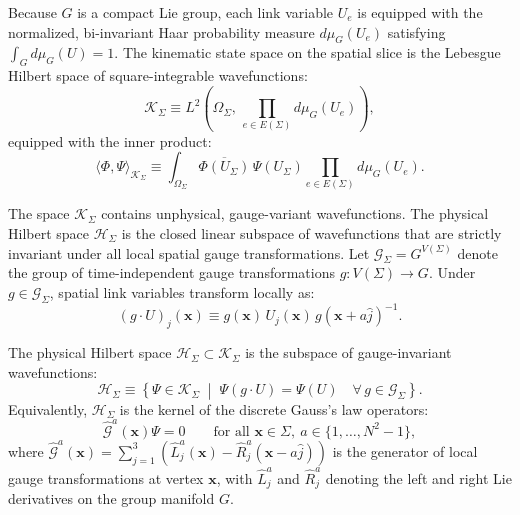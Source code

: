 Because $G$ is a compact Lie group, each link variable $U_e$ is equipped with the normalized, bi-invariant Haar probability measure $d\mu_G(U_e)$ satisfying $\int_G d\mu_G(U) = 1$. The kinematic state space on the spatial slice is the Lebesgue Hilbert space of square-integrable wavefunctions:
\begin{equation}
\label{eq:kinematic_hilbert_space}
\mathcal{K}_\Sigma \equiv L^2\left( \Omega_\Sigma, \, \prod_{e \in E(\Sigma)} d\mu_G(U_e) \right),
\end{equation}
equipped with the inner product:
\begin{equation}
\label{eq:kinematic_inner_product}
\langle \Phi, \Psi \rangle_{\mathcal{K}_\Sigma} \equiv \int_{\Omega_\Sigma} \overline{\Phi(U_\Sigma)} \, \Psi(U_\Sigma) \prod_{e \in E(\Sigma)} d\mu_G(U_e).
\end{equation}

The space $\mathcal{K}_\Sigma$ contains unphysical, gauge-variant wavefunctions. The physical Hilbert space $\mathcal{H}_\Sigma$ is the closed linear subspace of wavefunctions that are strictly invariant under all local spatial gauge transformations. Let $\mathcal{G}_\Sigma = G^{V(\Sigma)}$ denote the group of time-independent gauge transformations $g: V(\Sigma) \to G$. Under $g \in \mathcal{G}_\Sigma$, spatial link variables transform locally as:
\begin{equation}
\label{eq:spatial_gauge_transformation}
(g \cdot U)_j(\mathbf{x}) \equiv g(\mathbf{x}) \, U_j(\mathbf{x}) \, g(\mathbf{x} + a\hat{j})^{-1}.
\end{equation}

\begin{definition}
\label{def:physical_hilbert_space}
The physical Hilbert space $\mathcal{H}_\Sigma \subset \mathcal{K}_\Sigma$ is the subspace of gauge-invariant wavefunctions:
\begin{equation}
\label{eq:physical_hilbert_def}
\mathcal{H}_\Sigma \equiv \left\{ \Psi \in \mathcal{K}_\Sigma \;\middle|\; \Psi(g \cdot U) = \Psi(U) \quad \forall \, g \in \mathcal{G}_\Sigma \right\}.
\end{equation}
Equivalently, $\mathcal{H}_\Sigma$ is the kernel of the discrete Gauss's law operators:
\begin{equation}
\label{eq:discrete_gauss_law}
\hat{\mathcal{G}}^a(\mathbf{x}) \Psi = 0 \qquad \text{for all } \mathbf{x} \in \Sigma, \ a \in \{1, \dots, N^2 - 1\},
\end{equation}
where $\hat{\mathcal{G}}^a(\mathbf{x}) = \sum_{j=1}^3 \left( \hat{L}_j^a(\mathbf{x}) - \hat{R}_j^a(\mathbf{x} - a\hat{j}) \right)$ is the generator of local gauge transformations at vertex $\mathbf{x}$, with $\hat{L}_j^a$ and $\hat{R}_j^a$ denoting the left and right Lie derivatives on the group manifold $G$.
\end{definition}

